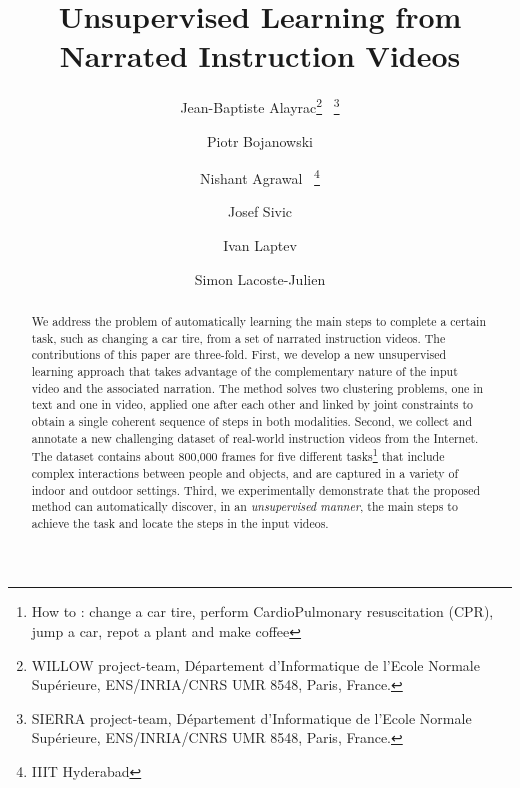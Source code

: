 \documentclass[10pt,twocolumn,letterpaper]{article}
\begin{document}
%
\title{Unsupervised Learning from Narrated Instruction Videos}

\author{
Jean-Baptiste Alayrac\thanks{WILLOW project-team, D\'{e}partement d'Informatique de l'Ecole Normale Sup\'{e}rieure, ENS/INRIA/CNRS UMR 8548, Paris, France.} \ \thanks{SIERRA project-team, D\'epartement d'Informatique de l'Ecole Normale Sup\'{e}rieure, ENS/INRIA/CNRS UMR 8548, Paris, France.}
\and
Piotr Bojanowski\footnotemark[1]
\and
Nishant Agrawal \footnotemark[1] \ \thanks{IIIT Hyderabad} 
\and
Josef Sivic\footnotemark[1]
\and
Ivan Laptev\footnotemark[1] 
\and
Simon Lacoste-Julien\footnotemark[2] 
}

\maketitle

%
\begin{abstract}
   We address the problem of automatically learning the main steps to complete a certain task, such as changing a car tire, 
from a set of narrated instruction videos. 
%
The contributions of this paper are three-fold.
First, we develop a new unsupervised learning approach that takes advantage of the complementary nature of the input video and the associated narration.   
The method solves two clustering problems, one in text and one in video, applied one after each other and linked by joint constraints to obtain a single coherent sequence of steps in both modalities.  
Second, we collect and annotate a new challenging dataset of real-world instruction videos from the Internet. The dataset contains about 800,000 frames for five different tasks\footnote{How to : change a car tire, perform CardioPulmonary resuscitation (CPR), jump a car, repot a plant and make coffee} that include complex interactions between people and objects, and are captured in a variety of indoor and outdoor settings.	
Third, we experimentally demonstrate that the proposed method can automatically discover, in an \emph{unsupervised manner}, the main steps to achieve the task and locate the steps in the input videos. 
%
%
%
%
%
\end{abstract}

%
%
\end{document}
